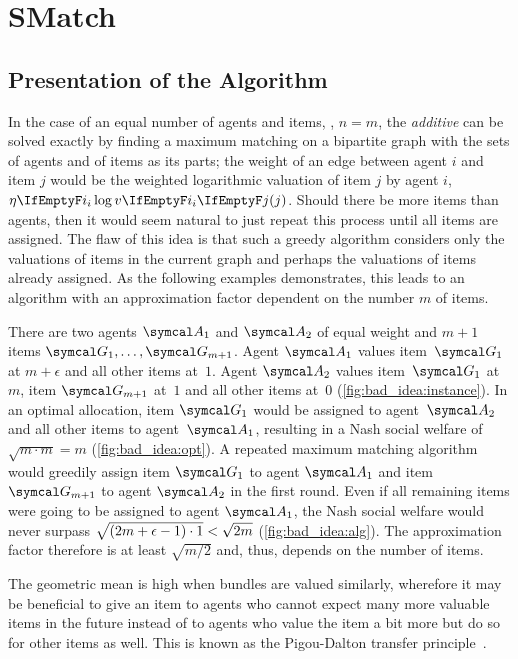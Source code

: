 \section{SMatch}
\label{sec:smatch}

\subsection{Presentation of the Algorithm}
\label{subsec:smatch:presentation}

In the case of an equal number of agents and items, \ie, \(n = m\), the \emph{additive} \NSW{} can be solved exactly by finding a maximum matching on a bipartite graph with the sets of agents and of items as its parts;
the weight of an edge between agent \(i\) and item \(j\) would be the weighted logarithmic valuation of item \(j\) by agent \(i\), \ie{} \(\weight \log \valuations[j]\).
Should there be more items than agents, then it would seem natural to just repeat this process until all items are assigned.
The flaw of this idea is that such a greedy algorithm considers only the valuations of items in the current graph and perhaps the valuations of items already assigned.
As the following examples demonstrates, this leads to an algorithm with an approximation factor dependent on the number \(m\) of items.
\begin{example}
	\label{ex:bad_idea}
	There are two agents \(\agents_{1}\) and \(\agents_{2}\) of equal weight and \(m+1\) items \(\goods_{1}, \dots, \goods_{m+1}\).
	Agent \(\agents_{1}\) values item~\(\goods_{1}\) at \(m + \epsilon\) and all other items at~\(1\).
	Agent \(\agents_{2}\) values item~\(\goods_{1}\) at \(m\), item \(\goods_{m+1}\) at~\(1\) and all other items at~\(0\) (\cref{fig:bad_idea:instance}).
	In an optimal allocation, item \(\goods_{1}\) would be assigned to agent~\(\agents_{2}\) and all other items to agent~\(\agents_{1}\), resulting in a Nash social welfare of \(\sqrt{m \cdot m} = m\) (\cref{fig:bad_idea:opt}).
	A repeated maximum matching algorithm would greedily assign item \(\goods_{1}\) to agent \(\agents_{1}\) and item \(\goods_{m+1}\) to agent \(\agents_{2}\) in the first round.
	Even if all remaining items were going to be assigned to agent \(\agents_{1}\), the Nash social welfare would never surpass \(\smash{\sqrt{(2m + \epsilon - 1) \cdot 1}} < \sqrt{2m}\) (\cref{fig:bad_idea:alg}).
	The approximation factor therefore is at least \(\sqrt{m/2}\) and, thus, depends on the number of items.
\end{example}
The geometric mean is high when bundles are valued similarly, wherefore it may be beneficial to give an item to agents who cannot expect many more valuable items in the future instead of to agents who value the item a bit more but do so for other items as well.
This is known as the Pigou-Dalton transfer principle~\cite{sublin_approx_algo_for_nsw_with_xos_valuations}.


